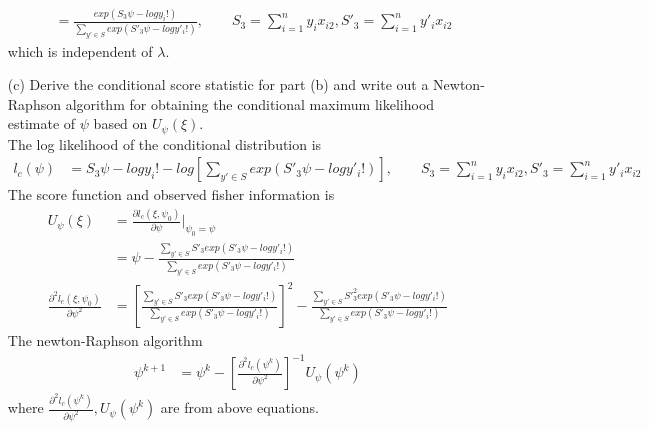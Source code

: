 \documentclass[11pt]{article} %
\begin{document}
\begin{itemize}
\begin{align*}
		&= \frac{exp \left( S_3 \psi  - log y_i!\right)}{\sum_{y' \in S} exp \left( S'_3 \psi - log y'_i! \right)}, \qquad S_3 = \sum_{i=1}^n y_i x_{i2}, S'_3 = \sum_{i=1}^n y'_i x_{i2}
	\end{align*}
	which is independent of $\lambda$. \\
	\item[(c)] Derive the conditional score statistic for part (b) and write out a Newton-Raphson algorithm for obtaining the conditional maximum likelihood estimate of $\psi$  based on $U_{\psi}(\xi)$.\\
	The log likelihood of the conditional distribution is
	\begin{align*}
		l_c(\psi) &= S_3 \psi  - log y_i! -log \left[ \sum_{y' \in S} exp \left( S'_3 \psi - log y'_i! \right) \right], \qquad S_3 = \sum_{i=1}^n y_i x_{i2}, S'_3 = \sum_{i=1}^n y'_i x_{i2}
	\end{align*} 
	The score function and observed fisher information is
	\begin{align*}
		U_{\psi}(\xi) &= \frac{\partial l_c(\xi, \psi_0)}{\partial \psi} |_{\psi_0=\psi}\\
		&= \psi - \frac{\sum_{y' \in S} S'_3 exp \left( S'_3 \psi - log y'_i! \right)}{\sum_{y' \in S} exp \left( S'_3 \psi - log y'_i! \right)}\\
		\frac{\partial^2 l_c(\xi, \psi_0)}{\partial \psi^2} &= \left[ \frac{\sum_{y' \in S} S'_3 exp \left( S'_3 \psi - log y'_i! \right)}{\sum_{y' \in S} exp \left( S'_3 \psi - log y'_i! \right)}\right]^2 - \frac{\sum_{y' \in S} S'^2_3 exp \left( S'_3 \psi - log y'_i! \right)}{\sum_{y' \in S} exp \left( S'_3 \psi - log y'_i! \right)}
	\end{align*}
	The newton-Raphson algorithm
	\begin{align*}
		\psi^{k+1} &= \psi^{k} - \left[\frac{\partial^2 l_c(\psi^{k})}{\partial \psi^2} \right]^{-1} U_{\psi}(\psi^{k})
	\end{align*}
	where $\frac{\partial^2 l_c(\psi^{k})}{\partial \psi^2}, U_{\psi}(\psi^{k})$ are from above equations.
	

\end{itemize}
\end{document}
